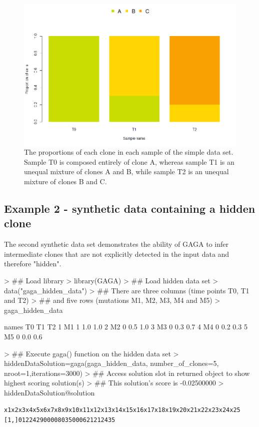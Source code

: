 \documentclass{article}
\begin{document}
\begin{figure}[H]
   \centering
       \includegraphics{gaga_simple_data_proportions}
   \caption{The proportions of each clone in each sample of the simple data set.  Sample T0 is composed entirely of clone A, whereas sample T1 is an unequal mixture of 
   clones A and B, while sample T2 is an unequal mixture of clones B and C.}
\end{figure}

\subsection{Example 2 - synthetic data containing a hidden clone}
The second synthetic data set demonstrates the ability of GAGA to infer intermediate clones that are not explicitly detected in the input data and therefore "hidden".

\begin{Schunk}
\begin{Sinput}
> ## Load library
> library(GAGA)
> ## Load hidden data set
> data("gaga_hidden_data")
> ## There  are three columns (time points T0, T1 and T2)
> ## and five rows (mutations M1, M2, M3, M4 and M5)
> gaga_hidden_data
\end{Sinput}
\begin{Soutput}
  names T0  T1  T2
1    M1  1 1.0 1.0
2    M2  0 0.5 1.0
3    M3  0 0.3 0.7
4    M4  0 0.2 0.3
5    M5  0 0.0 0.6
\end{Soutput}
\end{Schunk}

\begin{Schunk}
\begin{Sinput}
> ## Execute gaga() function on the hidden data set
> hiddenDataSolution=gaga(gaga_hidden_data, number_of_clones=5, nroot=1,iterations=3000)
> ## Access solution slot in returned object to show highest scoring solution(s)
> ## This solution's score is -0.02500000
> hiddenDataSolution@solution
\end{Sinput}
\end{Schunk}
\begin{alltt}
     x1 x2 x3 x4 x5 x6 x7 x8 x9 x10 x11 x12 x13 x14 x15 x16 x17 x18 x19 x20 x21 x22 x23 x24 x25
[1,]  0  1  2  2  4 29  0  0  0   0   8   0   3   5   0   0   0   6   2  12   1   2   4   3   5
\end{alltt}
\end{document}
